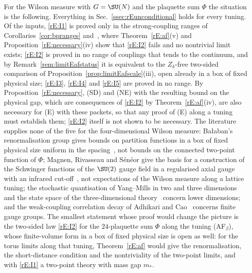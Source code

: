 \begin{remark}\label{rE:status}
For the Wilson measure with $G=\SU(N)$ and the plaquette sum $\Phi$ the
situation is the following. Everything in Sec.~\ref{ssec:rEunconditional}
holds for every tuning. Of the inputs, \ref{rE:I1} is proved only in the
strong-coupling ranges of Corollaries~\ref{cor:bpranges}
and~\cite[Corollary~322]{BBLR26}, where Theorem~\ref{rE:af}(v) and
Proposition~\ref{rE:necessary}(iv) show that \ref{rE:I2} fails and no
nontrivial limit exists; \ref{rE:I2} is proved in no range of couplings that
tends to the continuum, and by Remark~\ref{rem:limitEafstatus} it is
equivalent to the $Z_k$-free two-sided comparison of
Proposition~\ref{prop:limitEafscale}(iii), open already in a box of fixed
physical size; \ref{rE:I3}, \ref{rE:I4} and \ref{rE:I5} are proved in no
range. By Proposition~\ref{rE:necessary}, (SD) and (NE) with the resulting bound
on the physical gap, which are consequences of \ref{rE:I2} by
Theorem~\ref{rE:af}(iv), are also necessary for (E) with these packets, so
that any proof of (E) along a tuning must establish them; \ref{rE:I2} itself
is not shown to be necessary. The literature supplies none of the five
for the four-dimensional Wilson measure: Ba{\l}aban's renormalisation group
gives bounds on partition functions in a box of fixed physical size uniform
in the spacing~\cite{Bal84a,Bal85a,Bal87,Bal88,Bal89b}, not bounds on the
connected two-point function of $\Phi$; Magnen, Rivasseau and S\'en\'eor
give the basis for a construction of the Schwinger functions of the
$\SU(2)$ gauge field in a regularised axial gauge with an infrared
cut-off~\cite{MRS93}, not expectations of the Wilson measure along a
lattice tuning; the stochastic quantisation of Yang--Mills in two and three
dimensions~\cite{CCHS22,CCHS24} and the state space of the
three-dimensional theory~\cite{CC24} concern lower dimensions; and the weak-coupling correlation decay of
Adhikari and Cao~\cite{AC25} concerns finite gauge groups. The smallest
statement whose proof would change the picture is the two-sided law
\ref{rE:I2} for the $24$-plaquette sum $\Phi$ along the tuning
(AF$_\beta$), whose finite-volume form in a box of fixed physical size is
open as well: for the torus limits along that tuning, Theorem~\ref{rE:af}
would give the renormalisation, the short-distance condition and the
nontriviality of the two-point limits, and with \ref{rE:I1} a two-point
theory with mass gap $m_*$.
\end{remark}
